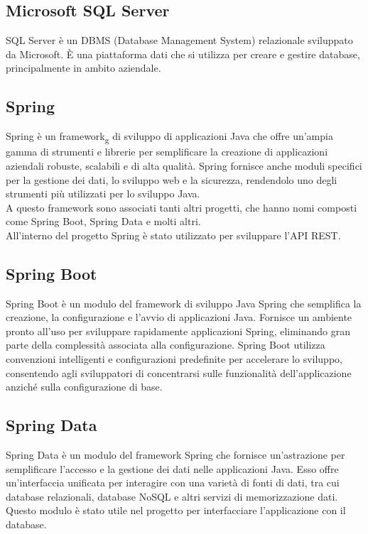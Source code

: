 \subsection*{Microsoft SQL Server}
SQL Server è un DBMS (Database Management System) relazionale sviluppato da Microsoft. È una piattaforma dati che si utilizza per creare e gestire database, principalmente in ambito aziendale.\\

\subsection*{Spring}
Spring è un framework\textsubscript{g} di sviluppo di applicazioni Java che offre un'ampia gamma di strumenti e librerie per semplificare la creazione di applicazioni aziendali robuste, scalabili e di alta qualità. 
Spring fornisce anche moduli specifici per la gestione dei dati, lo sviluppo web e la sicurezza, rendendolo uno degli strumenti più utilizzati per lo sviluppo Java.\\
A questo framework sono associati tanti altri progetti, che hanno nomi composti come Spring Boot, Spring Data e molti altri.\\
All'interno del progetto Spring è stato utilizzato per sviluppare l'API REST.
\\

\subsection*{Spring Boot}
Spring Boot è un modulo del framework di sviluppo Java Spring che semplifica la creazione, la configurazione e l'avvio di applicazioni Java. Fornisce un ambiente pronto all'uso per sviluppare rapidamente applicazioni Spring, eliminando gran parte della complessità associata alla configurazione. Spring Boot utilizza convenzioni intelligenti e configurazioni predefinite per accelerare lo sviluppo, consentendo agli sviluppatori di concentrarsi sulle funzionalità dell'applicazione anziché sulla configurazione di base.
\\

\subsection*{Spring Data}
Spring Data è un modulo del framework Spring che fornisce un'astrazione per semplificare l'accesso e la gestione dei dati nelle applicazioni Java. Esso offre un'interfaccia unificata per interagire con una varietà di fonti di dati, tra cui database relazionali, database NoSQL e altri servizi di memorizzazione dati.\\
Questo modulo è stato utile nel progetto per interfacciare l'applicazione con il database.
\\

